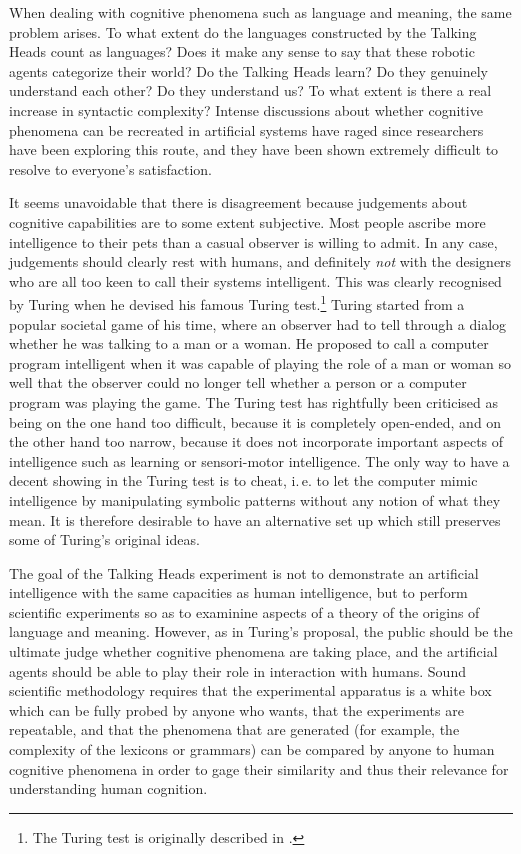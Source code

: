 When dealing with cognitive phenomena such as language
and meaning, the same problem arises. To what extent
do the languages constructed by the Talking Heads count
as languages? Does it make any sense to say that these robotic 
agents categorize their world? Do the Talking
Heads learn? Do they genuinely understand each other? Do they 
understand us? To what extent 
is there a real increase in syntactic 
complexity? Intense discussions about whether cognitive phenomena can 
be recreated in artificial systems 
have raged since researchers have been exploring this 
route, and they have been shown extremely difficult to resolve to 
everyone's satisfaction. 

It seems unavoidable that there is disagreement because 
judgements about cognitive capabilities are to some 
extent subjective. Most people ascribe more intelligence
to their pets than a casual observer is willing to admit. 
In any case, judgements should clearly rest with humans, and
definitely {\itshape not} with the designers 
who are all too keen to call their systems intelligent. 
This was clearly recognised by Turing  when he devised
his famous Turing test.\footnote{The Turing test is originally described in 
\cite{Turing:1950}.} Turing started from a popular societal 
game of his time, where an observer had to tell through
a dialog whether he was talking to a man or a woman. 
He proposed to call a computer program intelligent when 
it was capable of playing the role of a man or woman
so well that the observer could no longer tell whether
a person or a computer program was playing the game. 
The Turing test has rightfully been criticised as being
on the one hand too difficult, because it is completely 
open-ended, and on the other hand too narrow, because it 
does not incorporate important aspects of intelligence such 
as learning or sensori-motor intelligence. The only way 
to have a decent showing in the Turing test is to
cheat, i.\,e. to let the computer mimic intelligence 
by manipulating symbolic patterns without any notion of what 
they mean. It is therefore desirable to have an alternative
set up which still preserves some of Turing's original 
ideas. 

The goal of the Talking Heads experiment is not to demonstrate 
an artificial intelligence with the same capacities as 
human intelligence, but to perform
scientific experiments so as to examinine aspects 
of a theory of the origins of language and meaning. 
However, as in Turing's proposal, the public should be 
the ultimate judge whether cognitive phenomena are taking
place, and the artificial agents should be able to play their role
in interaction with humans. 
Sound scientific methodology requires that 
the experimental apparatus is a white box which can be fully probed 
by anyone who wants, that the experiments are repeatable, 
and that the phenomena that are generated 
(for example, the complexity of the lexicons or 
grammars) can be 
compared by anyone to human cognitive phenomena in order to gage 
their similarity and thus their relevance for understanding
human cognition. 

